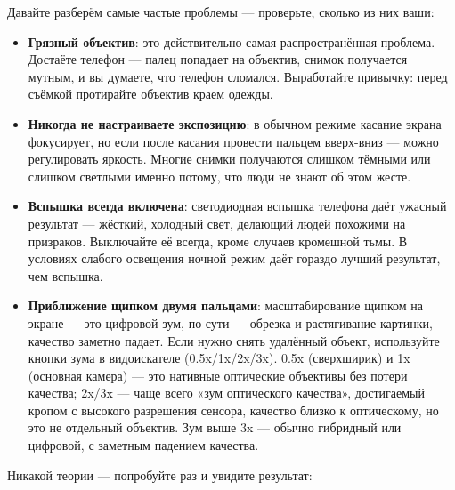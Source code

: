 


Давайте разберём самые частые проблемы — проверьте, сколько из них ваши:

\begin{itemize}
  \item \textbf{Грязный объектив}: это действительно самая распространённая проблема. Достаёте телефон — палец попадает на объектив, снимок получается мутным, и вы думаете, что телефон сломался. Выработайте привычку: перед съёмкой протирайте объектив краем одежды.
  \item \textbf{Никогда не настраиваете экспозицию}: в обычном режиме касание экрана фокусирует, но если после касания провести пальцем вверх-вниз — можно регулировать яркость. Многие снимки получаются слишком тёмными или слишком светлыми именно потому, что люди не знают об этом жесте.
  \item \textbf{Вспышка всегда включена}: светодиодная вспышка телефона даёт ужасный результат — жёсткий, холодный свет, делающий людей похожими на призраков. Выключайте её всегда, кроме случаев кромешной тьмы. В условиях слабого освещения ночной режим даёт гораздо лучший результат, чем вспышка.
  \item \textbf{Приближение щипком двумя пальцами}: масштабирование щипком на экране — это цифровой зум, по сути — обрезка и растягивание картинки, качество заметно падает. Если нужно снять удалённый объект, используйте кнопки зума в видоискателе (0.5x/1x/2x/3x). 0.5x (сверхширик) и 1x (основная камера) — это нативные оптические объективы без потери качества; 2x/3x — чаще всего «зум оптического качества», достигаемый кропом с высокого разрешения сенсора, качество близко к оптическому, но это не отдельный объектив. Зум выше 3x — обычно гибридный или цифровой, с заметным падением качества.
\end{itemize}


Никакой теории — попробуйте раз и увидите результат:

